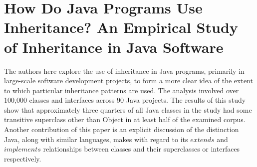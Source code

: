 \section{How Do Java Programs Use Inheritance? An Empirical Study of Inheritance in Java Software~\cite{HowProgramsUseInheritance}}
The authors here explore the use of inheritance in Java programs, primarily in large-scale software development projects, to form a more clear idea of the extent to which particular inheritance patterns are used. The analysis involved over 100,000 classes and interfaces across 90 Java projects. The results of this study show that approximately three quarters of all Java classes in the study had some transitive superclass other than Object in at least half of the examined corpus. \newline
Another contribution of this paper is an explicit discussion of the distinction Java, along with similar languages, makes with regard to its $extends$ and $implements$ relationships between classes and their superclasses or interfaces respectively.
